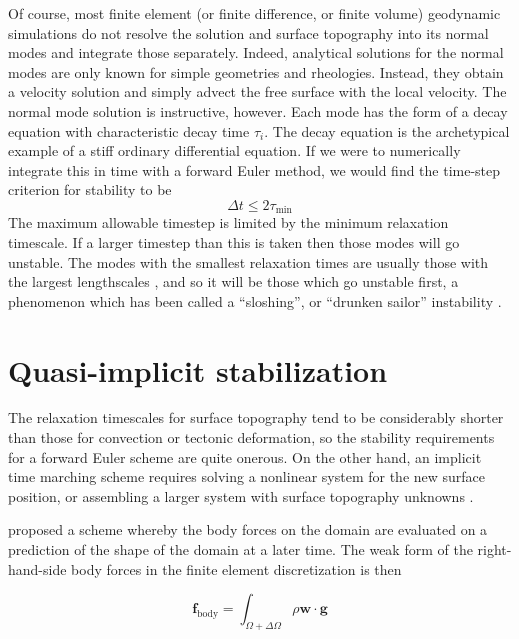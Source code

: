 \documentclass[preprint,12pt,authoryear]{elsarticle}
\begin{document}
Of course, most finite element (or finite difference, or finite volume) geodynamic simulations do not resolve 
the solution and surface topography into its normal modes and integrate those separately. 
Indeed, analytical solutions for the normal modes are only known for simple geometries and rheologies.
Instead, they obtain a velocity solution and simply advect the free surface with the local velocity.
The normal mode solution is instructive, however. 
Each mode has the form of a decay equation with characteristic decay time $\tau_i$.
The decay equation is the archetypical example of a stiff ordinary differential equation.
If we were to numerically integrate this in time with a forward Euler method, we would find the 
time-step criterion for stability \citep[e.g.][]{leveque2007finite} to be
\begin{equation}
\Delta t  \le 2 \tau_{\mathrm{min}}
\label{eq:cfl_euler}
\end{equation}
The maximum allowable timestep is limited by the minimum relaxation timescale.
If a larger timestep than this is taken then those modes will go unstable.
The modes with the smallest relaxation times are usually those with the largest lengthscales \citep{schubert2001mantle}, 
and so it will be those which go unstable first, a phenomenon which has been called 
a ``sloshing'', or ``drunken sailor'' instability \citep{kaus2010stabilization}.

\section{Quasi-implicit stabilization}
\label{sec:kmm}

The relaxation timescales for surface topography tend to be considerably shorter than those for 
convection or tectonic deformation, so the stability requirements for a forward Euler scheme
are quite onerous.  On the other hand, an implicit time marching scheme requires solving 
a nonlinear system for the new surface position, or assembling a larger system with surface
topography unknowns \citep[e.g.][]{kramer2012implicit}.

\citet{kaus2010stabilization} proposed a scheme whereby the body forces on the domain are 
evaluated on a prediction of the shape of the domain at a later time.
The weak form of the right-hand-side body forces in the finite element discretization is then

\begin{equation}
\mathbf{f}_{\mathrm{body}} = \int_{\Omega + \Delta \Omega} \rho \mathbf{w} \cdot \mathbf{g}
\label{eq:predict}
\end{equation}
\end{document}
